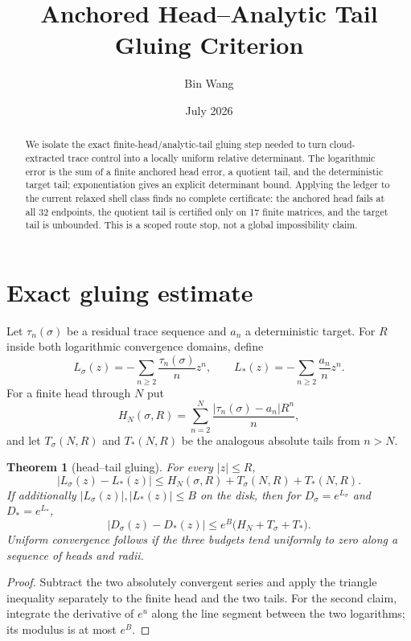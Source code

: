 \documentclass[11pt]{article}
\title{Anchored Head--Analytic Tail Gluing Criterion}
\author{Bin Wang}
\date{July 2026}
\newtheorem{theorem}{Theorem}
\begin{document}
\maketitle

\begin{abstract}
We isolate the exact finite-head/analytic-tail gluing step needed to turn
cloud-extracted trace control into a locally uniform relative determinant.
The logarithmic error is the sum of a finite anchored head error, a quotient
tail, and the deterministic target tail; exponentiation gives an explicit
determinant bound.  Applying the ledger to the current relaxed shell class
finds no complete certificate: the anchored head fails at all 32 endpoints,
the quotient tail is certified only on 17 finite matrices, and the target tail
is unbounded.  This is a scoped route stop, not a global impossibility claim.
\end{abstract}

\section{Exact gluing estimate}

Let $\tau_n(\sigma)$ be a residual trace sequence and $a_n$ a deterministic
target.  For $R$ inside both logarithmic convergence domains, define
\[
 L_\sigma(z)=-\sum_{n\ge2}\frac{\tau_n(\sigma)}{n}z^n,
 \qquad
 L_*(z)=-\sum_{n\ge2}\frac{a_n}{n}z^n.
\]
For a finite head through $N$ put
\[
 H_N(\sigma,R)=\sum_{n=2}^{N}\frac{|\tau_n(\sigma)-a_n|R^n}{n},
\]
and let $T_\sigma(N,R)$ and $T_*(N,R)$ be the analogous absolute tails
from $n>N$.

\begin{theorem}[head--tail gluing]\label{thm:glue}
For every $|z|\le R$,
\begin{equation}\label{eq:log-error}
 |L_\sigma(z)-L_*(z)|
 \le H_N(\sigma,R)+T_\sigma(N,R)+T_*(N,R).
\end{equation}
If additionally $|L_\sigma(z)|,|L_*(z)|\le B$ on the disk, then for
$D_\sigma=e^{L_\sigma}$ and $D_*=e^{L_*}$,
\begin{equation}\label{eq:det-error}
 |D_\sigma(z)-D_*(z)|
 \le e^B\bigl(H_N+T_\sigma+T_*\bigr).
\end{equation}
Uniform convergence follows if the three budgets tend uniformly to zero
along a sequence of heads and radii.
\end{theorem}

\begin{proof}
Subtract the two absolutely convergent series and apply the triangle
inequality separately to the finite head and the two tails.  For the second
claim, integrate the derivative of $e^u$ along the line segment between the
two logarithms; its modulus is at most $e^B$.
\end{proof}
\end{document}
